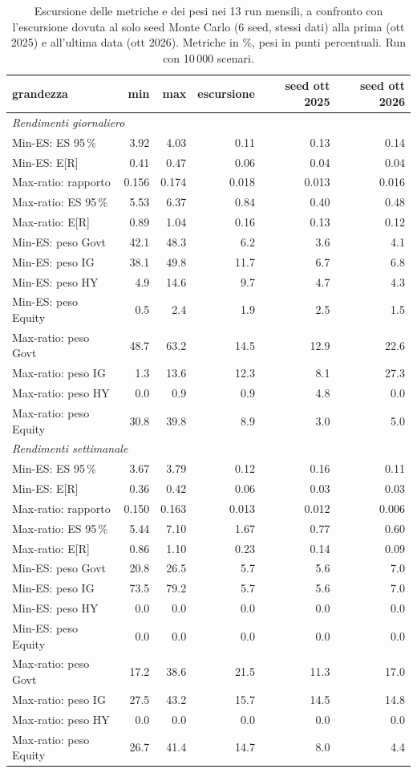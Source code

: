 \begin{table}[htbp]\centering\small\setlength{\tabcolsep}{3.5pt}
\caption{Escursione delle metriche e dei pesi nei 13 run mensili, a confronto con l'escursione dovuta al solo seed Monte Carlo (6 seed, stessi dati) alla prima (ott 2025) e all'ultima data (ott 2026). Metriche in \%, pesi in punti percentuali. Run con 10\,000 scenari.}\label{tab:summary_10k}
\begin{tabular}{lrrrrr}\toprule
grandezza & min & max & escursione & seed ott 2025 & seed ott 2026 \\\midrule
\multicolumn{6}{l}{\emph{Rendimenti giornaliero}} \\
Min-ES: ES 95\,\% & 3.92 & 4.03 & 0.11 & 0.13 & 0.14 \\
Min-ES: E[R] & 0.41 & 0.47 & 0.06 & 0.04 & 0.04 \\
Max-ratio: rapporto & 0.156 & 0.174 & 0.018 & 0.013 & 0.016 \\
Max-ratio: ES 95\,\% & 5.53 & 6.37 & 0.84 & 0.40 & 0.48 \\
Max-ratio: E[R] & 0.89 & 1.04 & 0.16 & 0.13 & 0.12 \\
Min-ES: peso Govt & 42.1 & 48.3 & 6.2 & 3.6 & 4.1 \\
Min-ES: peso IG & 38.1 & 49.8 & 11.7 & 6.7 & 6.8 \\
Min-ES: peso HY & 4.9 & 14.6 & 9.7 & 4.7 & 4.3 \\
Min-ES: peso Equity & 0.5 & 2.4 & 1.9 & 2.5 & 1.5 \\
Max-ratio: peso Govt & 48.7 & 63.2 & 14.5 & 12.9 & 22.6 \\
Max-ratio: peso IG & 1.3 & 13.6 & 12.3 & 8.1 & 27.3 \\
Max-ratio: peso HY & 0.0 & 0.9 & 0.9 & 4.8 & 0.0 \\
Max-ratio: peso Equity & 30.8 & 39.8 & 8.9 & 3.0 & 5.0 \\
\multicolumn{6}{l}{\emph{Rendimenti settimanale}} \\
Min-ES: ES 95\,\% & 3.67 & 3.79 & 0.12 & 0.16 & 0.11 \\
Min-ES: E[R] & 0.36 & 0.42 & 0.06 & 0.03 & 0.03 \\
Max-ratio: rapporto & 0.150 & 0.163 & 0.013 & 0.012 & 0.006 \\
Max-ratio: ES 95\,\% & 5.44 & 7.10 & 1.67 & 0.77 & 0.60 \\
Max-ratio: E[R] & 0.86 & 1.10 & 0.23 & 0.14 & 0.09 \\
Min-ES: peso Govt & 20.8 & 26.5 & 5.7 & 5.6 & 7.0 \\
Min-ES: peso IG & 73.5 & 79.2 & 5.7 & 5.6 & 7.0 \\
Min-ES: peso HY & 0.0 & 0.0 & 0.0 & 0.0 & 0.0 \\
Min-ES: peso Equity & 0.0 & 0.0 & 0.0 & 0.0 & 0.0 \\
Max-ratio: peso Govt & 17.2 & 38.6 & 21.5 & 11.3 & 17.0 \\
Max-ratio: peso IG & 27.5 & 43.2 & 15.7 & 14.5 & 14.8 \\
Max-ratio: peso HY & 0.0 & 0.0 & 0.0 & 0.0 & 0.0 \\
Max-ratio: peso Equity & 26.7 & 41.4 & 14.7 & 8.0 & 4.4 \\
\bottomrule\end{tabular}\end{table}
